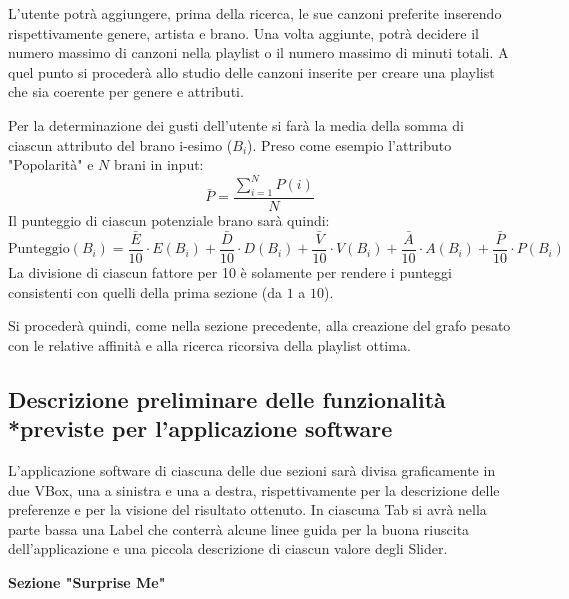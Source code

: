 \documentclass[12pt, a4paper]{article}
\begin{document}
L'utente potrà aggiungere, prima della ricerca, le sue canzoni preferite inserendo rispettivamente genere, artista e brano.
Una volta aggiunte, potrà decidere il numero massimo di canzoni nella playlist o il numero massimo di minuti totali.
A quel punto si procederà allo studio delle canzoni inserite per creare una playlist che sia coerente per genere e attributi. \par
Per la determinazione dei gusti dell'utente si farà la media della somma di ciascun attributo del brano i-esimo ($B_i$).
Preso come esempio l'attributo "Popolarità" e $N$ brani in input:
$$ \bar P = \frac{\sum_{i=1}^NP(i)}{N} $$
Il punteggio di ciascun potenziale brano sarà quindi:
$$ \text{Punteggio}(B_i) = \frac{\bar E}{10} \cdot E(B_i) + \frac{\bar D}{10} \cdot D(B_i) + \frac{\bar V}{10} \cdot V(B_i) + \frac{\bar A}{10} \cdot A(B_i) + \frac{\bar P}{10} \cdot P(B_i) $$
La divisione di ciascun fattore per 10 è solamente per rendere i punteggi consistenti con quelli della prima sezione (da $1$ a $10$).\par
Si procederà quindi, come nella sezione precedente, alla creazione del grafo pesato con le relative affinità e alla ricerca ricorsiva della playlist ottima.


\subsection[Descrizione preliminare delle funzionalità previste per l’applicazione software]{Descrizione preliminare delle funzionalità\\*previste per l’applicazione software}

L’applicazione software di ciascuna delle due sezioni sarà divisa graficamente in due VBox, una a sinistra e una a destra, rispettivamente per la descrizione delle preferenze e per la visione del risultato ottenuto. In ciascuna Tab si avrà nella parte bassa una Label che conterrà alcune linee guida per la buona riuscita dell’applicazione e una piccola descrizione di ciascun valore degli Slider.

\textbf{Sezione "Surprise Me"}
\end{document}

